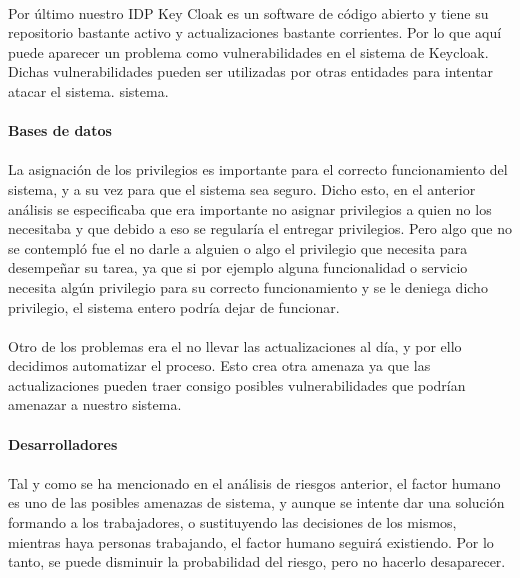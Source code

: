 \paragraph{}
Por último nuestro IDP Key Cloak es un software de código abierto y
tiene su repositorio bastante activo y actualizaciones bastante
corrientes. Por lo que aquí puede aparecer un problema como
vulnerabilidades en el sistema de Keycloak. Dichas vulnerabilidades
pueden ser utilizadas por otras entidades para intentar atacar el
sistema.  sistema.
\paragraph{}
\textbf{Bases de datos}
\paragraph{}
La asignación de los privilegios es importante para el correcto
funcionamiento del sistema, y a su vez para que el sistema sea
seguro. Dicho esto, en el anterior análisis se especificaba que era
importante no asignar privilegios a quien no los necesitaba y que
debido a eso se regularía el entregar privilegios. Pero algo que no se
contempló fue el no darle a alguien o algo el privilegio que necesita
para desempeñar su tarea, ya que si por ejemplo alguna funcionalidad o
servicio necesita algún privilegio para su correcto funcionamiento y
se le deniega dicho privilegio, el sistema entero podría dejar de
funcionar.
\paragraph{}
Otro de los problemas era el no llevar las actualizaciones al día, y
por ello decidimos automatizar el proceso. Esto crea otra amenaza ya
que las actualizaciones pueden traer consigo posibles vulnerabilidades
que podrían amenazar a nuestro sistema.
\paragraph{}
\textbf{Desarrolladores}
\paragraph{}
Tal y como se ha mencionado en el análisis de riesgos anterior, el
factor humano es uno de las posibles amenazas de sistema, y aunque se
intente dar una solución formando a los trabajadores, o sustituyendo
las decisiones de los mismos, mientras haya personas trabajando, el
factor humano seguirá existiendo. Por lo tanto, se puede disminuir la
probabilidad del riesgo, pero no hacerlo desaparecer.
